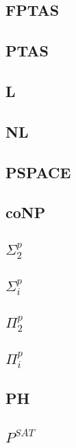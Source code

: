\documentclass[]{article}
\theoremstyle{definition}
\begin{document}
\subsection{FPTAS}

\subsection{PTAS}

\subsection{L}

\subsection{NL}

\subsection{PSPACE}

\subsection{coNP}

\subsection{$\Sigma^p_2$}

\subsection{$\Sigma^p_i$}

\subsection{$\Pi^p_2$}

\subsection{$\Pi^p_i$}

\subsection{PH}

\subsection{$P^{SAT}$}
\end{document}

